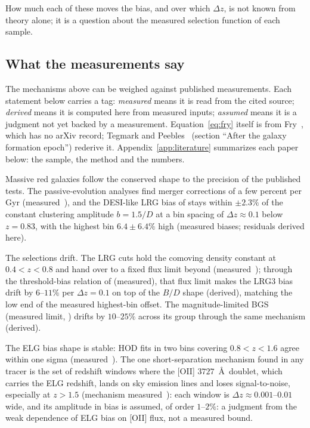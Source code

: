 \documentclass[11pt]{article}
\begin{document}
How much each of these moves the bias, and over which $\Delta z$, is
not known from theory alone; it is a question about the measured
selection function of each sample.

\subsection{What the measurements say}
\label{sec:evidence}

The mechanisms above can be weighed against published measurements.
Each statement below carries a tag: \emph{measured} means it is read
from the cited source; \emph{derived} means it is computed here from
measured inputs; \emph{assumed} means it is a judgment not yet backed
by a measurement.  Equation~\eqref{eq:fry} itself is from
Fry~\cite{Fry1996}, which has no arXiv record; Tegmark and
Peebles~\cite{TegmarkPeebles1998} (section ``After the galaxy
formation epoch'') rederive it.  Appendix~\ref{app:literature}
summarizes each paper below: the sample, the method and the numbers.

Massive red galaxies follow the conserved shape to the precision of
the published tests.  The passive-evolution analyses find merger
corrections of a few percent per Gyr
(measured~\cite{Wake2008, Tojeiro2012, Guo2013}), and the DESI-like
LRG bias of \cite{Zhou2021} stays within $\pm 2.3\%$ of the constant
clustering amplitude $b = 1.5/D$ at a bin spacing of
$\Delta z \approx 0.1$ below $z = 0.83$, with the highest bin
$6.4 \pm 6.4\%$ high (measured biases; residuals derived here).

The selections drift.  The LRG cuts hold the comoving density
constant at $0.4 < z < 0.8$ and hand over to a fixed flux limit
beyond (measured~\cite{Zhou2023lrg}); through the threshold-bias
relation of \cite{Zehavi2011} (measured), that flux limit makes the
LRG3 bias drift by $6$--$11\%$ per $\Delta z = 0.1$ on top of the
$B/D$ shape (derived), matching the low end of the measured
highest-bin offset.  The magnitude-limited BGS (measured limit,
\cite{Hahn2023}) drifts by $10$--$25\%$ across its group through the
same mechanism (derived).

The ELG bias shape is stable: HOD fits in two bins covering
$0.8 < z < 1.6$ agree within one sigma (measured~\cite{Rocher2023}).
The one short-separation mechanism found in any tracer is the set of
redshift windows where the [OII] $3727$~\AA\ doublet, which carries
the ELG redshift, lands on sky emission lines and loses
signal-to-noise, especially at $z > 1.5$ (mechanism
measured~\cite{Raichoor2023}): each window is
$\Delta z \approx 0.001$--$0.01$ wide, and its amplitude in bias is
assumed, of order $1$--$2\%$: a judgment from the weak dependence of
ELG bias on [OII] flux, not a measured bound.
\end{document}
